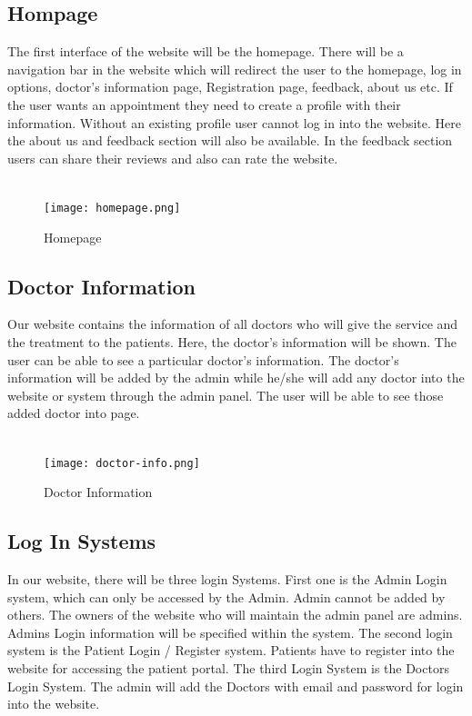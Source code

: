 \documentclass[14pt,a4paper,calibribody]{article}
\begin{document}
\subsection{Hompage}
The first interface of the website will be the homepage. There will be a navigation bar in the website which will redirect the user to the homepage, log in options, doctor’s information page, Registration page, feedback, about us etc. If the user wants an appointment they need to create a profile with their information. Without an existing profile user cannot log in into the website. Here the about us and feedback section will also be available. In the feedback section users can share their reviews and also can rate the website.\\\\
\begin{figure}[h]
\texttt{[image: homepage.png]}\\
\caption{Homepage}
\end{figure}
\subsection{Doctor Information}
Our website contains the information of all doctors who will give the service and the treatment to the patients. Here, the doctor’s information will be shown. The user can be able to see a particular doctor’s information. The doctor’s information will be added by the admin while he/she will add any doctor into the website or system through the admin panel. The user will be able to see those added doctor into page.\\\\
\begin{figure}[h]
\texttt{[image: doctor-info.png]}\\
\caption{Doctor Information}
\end{figure}
\subsection{Log In Systems}
In our website, there will be three login Systems. First one is the Admin Login system, which can only be accessed by the Admin. Admin cannot be added by others. The owners of the website who will maintain the admin panel are admins. Admins Login information will be specified within the system. The second login system is the Patient Login / Register system. Patients have to register into the website for accessing the patient portal. The third Login System is the Doctors Login System. The admin will add the Doctors with email and password for login into the website.
\end{document}
